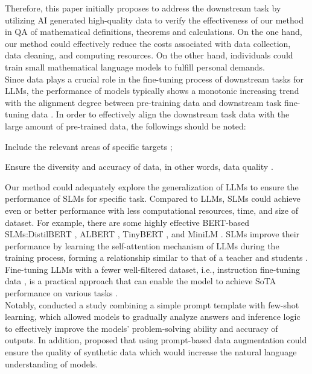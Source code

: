 \documentclass[10pt]{article}
\begin{document}
Therefore, this paper initially proposes to address the downstream task by utilizing AI generated high-quality data to verify the effectiveness of our method in QA of mathematical definitions, theorems and calculations. On the one hand, our method could effectively reduce the costs associated with data collection, data cleaning, and computing resources. On the other hand, individuals could train small mathematical language models to fulfill personal demands.\\

Since data plays a crucial role in the fine-tuning process of downstream tasks for LLMs, the performance of models typically shows a monotonic increasing trend with the alignment degree between pre-training data and downstream task fine-tuning data \cite{isik2024scalinglawsdownstreamtask}. In order to effectively align the downstream task data with the large amount of pre-trained data, the followings should be noted: \begin{inparaenum}[(i)] \item Include the relevant areas of specific targets \cite{wei2022finetunedlanguagemodelszeroshot}; \item Ensure the diversity and accuracy of data, in other words, data quality \cite{Li2023FromQT}. \end{inparaenum} Our method could adequately explore the generalization of LLMs to ensure the performance of SLMs for specific task. Compared to LLMs, SLMs could achieve even or better performance with less computational resources, time, and size of dataset. For example, there are some highly effective BERT-based SLMs:DistilBERT \cite{sanh2020distilbertdistilledversionbert}, ALBERT \cite{DBLP:journals/corr/abs-1909-11942}, TinyBERT \cite{jiao2019tinybert}, and MiniLM \cite{wang2020minilm}. SLMs improve their performance by learning the self-attention mechanism of LLMs during the training process, forming a relationship similar to that of a teacher and students \cite{wang2020minilmdeepselfattentiondistillation,Liang2023LetGB}. Fine-tuning LLMs with a fewer well-filtered dataset, i.e., instruction fine-tuning data \cite{Li2023FromQT}, is a practical approach that can enable the model to achieve SoTA performance on various tasks \cite{Chen2023AlpaGasusTA}. \\
 
Notably, \cite{kojima2023largelanguagemodelszeroshot} conducted a study combining a simple prompt template with few-shot learning, which allowed models to gradually analyze answers and inference logic to effectively improve the models' problem-solving ability and accuracy of outputs.  In addition, \cite{Wang2022PromDAPD} proposed that using prompt-based data augmentation could ensure the quality of synthetic data which would increase the natural language understanding of models.
\\
 
\end{document}

